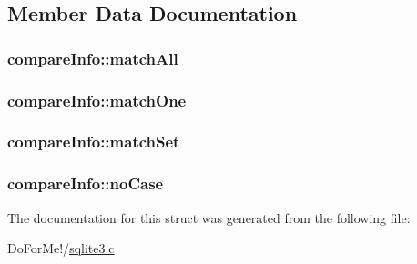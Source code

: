 \subsection{Member Data Documentation}
\hypertarget{structcompare_info_a1161e850029ef556e6daee856d32b2e2}{
\subsubsection[{match\-All}]{ compare\-Info\-::match\-All}}\label{structcompare_info_a1161e850029ef556e6daee856d32b2e2}
\hypertarget{structcompare_info_ab9aabbf6d3df26bad786b532330a2fd7}{
\subsubsection[{match\-One}]{ compare\-Info\-::match\-One}}\label{structcompare_info_ab9aabbf6d3df26bad786b532330a2fd7}
\hypertarget{structcompare_info_a5d2ff58a72c9eb7d22f18915c1751655}{
\subsubsection[{match\-Set}]{ compare\-Info\-::match\-Set}}\label{structcompare_info_a5d2ff58a72c9eb7d22f18915c1751655}
\hypertarget{structcompare_info_a6de76861b066547321f7a255cb7042ab}{
\subsubsection[{no\-Case}]{ compare\-Info\-::no\-Case}}\label{structcompare_info_a6de76861b066547321f7a255cb7042ab}


The documentation for this struct was generated from the following file\-:\begin{DoxyCompactItemize}
\item 
Do\-For\-Me!/\hyperlink{sqlite3_8c}{sqlite3.\-c}\end{DoxyCompactItemize}
